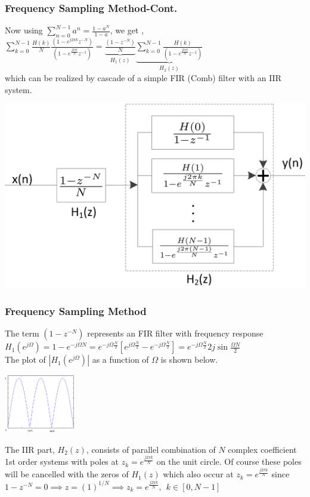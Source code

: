 \documentclass[mathserif, 10pt]{beamer} %
\begin{document}
\frame
{

\small
\frametitle{Frequency Sampling Method-Cont. }
Now using $\sum\limits_{n=0}^{N-1} a^n = \frac{1-a^N}{1-a}$, we get ,\\

$\sum\limits_{k=0}^{N-1} \frac{H(k)}{N}\frac{(1-e^{j2 \pi k}z^{-N})}{(1-e^\frac{j2 \pi k}{N}z^{-1})} = \underbrace{\frac{(1-z^{-N})}{N}}_{H_1(z)} \underbrace{\sum\limits_{k=0}^{N-1}\frac{H(k)}{(1-e^\frac{j2 \pi k}{N}z^{-1})}}_{H_2(z)}$\\
which can be realized by cascade of a simple FIR (Comb) filter with an IIR system. \\ \vspace{.1in}

\hspace{1in}
\includegraphics[width=.55\linewidth]{./Figures/cascade.png}

}

\frame
{

\normalsize
\frametitle{Frequency Sampling Method}
The term $(1-z^{-N})$ represents an FIR filter with frequency response $H_1(e^{j\Omega}) = 1-e^{-j\Omega N} = e^{-j\Omega \frac{N}{2}}\left[e^{j\Omega\frac{N}{2}}-e^{-j\Omega\frac{N}{2}}\right] = e^{-j\Omega\frac{N}{2}}2j \sin\frac{\Omega N}{2}$ \\

The plot of $|H_1(e^{j\Omega})|$ as a function of $\Omega$  is shown below. \vspace{.1in}

\hspace{1in}
\includegraphics[width=.5\linewidth,height=1in]{./Figures/comb.png} \vspace{.1in}

The IIR part, $H_2(z)$, consists of parallel combination of $N$ complex coefficient 1st order systems with poles at $z_k = e^{\frac{j2\pi k}{N}}$ on the unit circle.  Of course these poles will be cancelled with the zeros of $H_1(z)$ which also occur at $z_k = e^{\frac{j2\pi k}{N}}$ since $1-z^{-N} =0  \implies z = (1)^{1/N} \implies z_k = e^\frac{j2\pi k}{N}, ~~k\in[0,N-1]$\\ \vspace{.1in}

}
\end{document}
